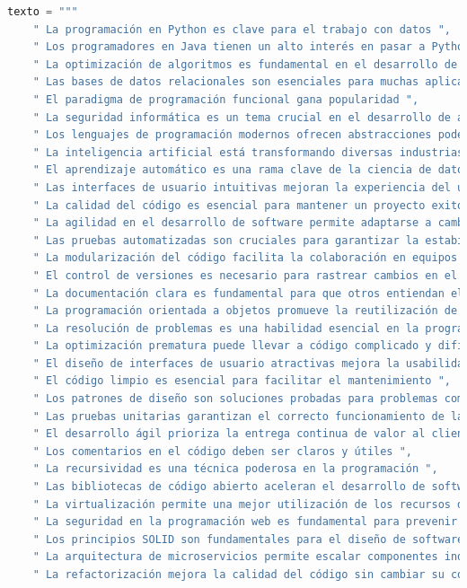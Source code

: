 \documentclass[journal, spanish]{IEEEtran}
\begin{document}
\begin{lstlisting}[language=Python]
texto = """
    " La programación en Python es clave para el trabajo con datos ",
    " Los programadores en Java tienen un alto interés en pasar a Python ",
    " La optimización de algoritmos es fundamental en el desarrollo de software ",
    " Las bases de datos relacionales son esenciales para muchas aplicaciones ",
    " El paradigma de programación funcional gana popularidad ",
    " La seguridad informática es un tema crucial en el desarrollo de aplicaciones web ",
    " Los lenguajes de programación modernos ofrecen abstracciones poderosas ",
    " La inteligencia artificial está transformando diversas industrias ",
    " El aprendizaje automático es una rama clave de la ciencia de datos ",
    " Las interfaces de usuario intuitivas mejoran la experiencia del usuario ",
    " La calidad del código es esencial para mantener un proyecto exitoso ",
    " La agilidad en el desarrollo de software permite adaptarse a cambios rápidamente ",
    " Las pruebas automatizadas son cruciales para garantizar la estabilidad del software ",
    " La modularización del código facilita la colaboración en equipos de programadores ",
    " El control de versiones es necesario para rastrear cambios en el código ",
    " La documentación clara es fundamental para que otros entiendan el código ",
    " La programación orientada a objetos promueve la reutilización de código ",
    " La resolución de problemas es una habilidad esencial en la programación ",
    " La optimización prematura puede llevar a código complicado y difícil de mantener ",
    " El diseño de interfaces de usuario atractivas mejora la usabilidad de las aplicaciones ",
    " El código limpio es esencial para facilitar el mantenimiento ",
    " Los patrones de diseño son soluciones probadas para problemas comunes ",
    " Las pruebas unitarias garantizan el correcto funcionamiento de las partes del código ",
    " El desarrollo ágil prioriza la entrega continua de valor al cliente ",
    " Los comentarios en el código deben ser claros y útiles ",
    " La recursividad es una técnica poderosa en la programación ",
    " Las bibliotecas de código abierto aceleran el desarrollo de software ",
    " La virtualización permite una mejor utilización de los recursos de hardware ",
    " La seguridad en la programación web es fundamental para prevenir ataques ",
    " Los principios SOLID son fundamentales para el diseño de software robusto ",
    " La arquitectura de microservicios permite escalar componentes individualmente ",
    " La refactorización mejora la calidad del código sin cambiar su comportamiento ",

\end{lstlisting}
\end{document}
